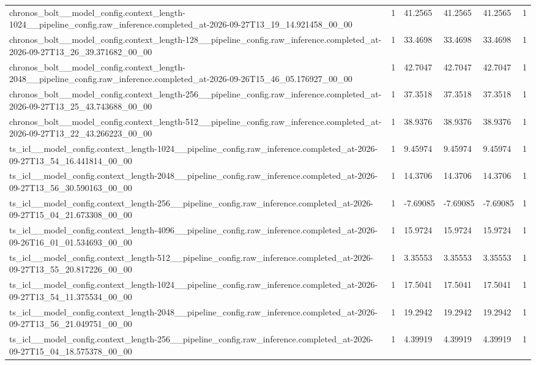 \begin{tabular}{llllll}
chronos\_bolt\_\_model\_config.context\_length-1024\_\_pipeline\_config.raw\_inference.completed\_at-2026-09-27T13\_19\_14.921458\_00\_00 & 1 & 41.2565 & 41.2565 & 41.2565 & 1 \\
chronos\_bolt\_\_model\_config.context\_length-128\_\_pipeline\_config.raw\_inference.completed\_at-2026-09-27T13\_26\_39.371682\_00\_00 & 1 & 33.4698 & 33.4698 & 33.4698 & 1 \\
chronos\_bolt\_\_model\_config.context\_length-2048\_\_pipeline\_config.raw\_inference.completed\_at-2026-09-26T15\_46\_05.176927\_00\_00 & 1 & 42.7047 & 42.7047 & 42.7047 & 1 \\
chronos\_bolt\_\_model\_config.context\_length-256\_\_pipeline\_config.raw\_inference.completed\_at-2026-09-27T13\_25\_43.743688\_00\_00 & 1 & 37.3518 & 37.3518 & 37.3518 & 1 \\
chronos\_bolt\_\_model\_config.context\_length-512\_\_pipeline\_config.raw\_inference.completed\_at-2026-09-27T13\_22\_43.266223\_00\_00 & 1 & 38.9376 & 38.9376 & 38.9376 & 1 \\
ts\_icl\_\_model\_config.context\_length-1024\_\_pipeline\_config.raw\_inference.completed\_at-2026-09-27T13\_54\_16.441814\_00\_00 & 1 & 9.45974 & 9.45974 & 9.45974 & 1 \\
ts\_icl\_\_model\_config.context\_length-2048\_\_pipeline\_config.raw\_inference.completed\_at-2026-09-27T13\_56\_30.590163\_00\_00 & 1 & 14.3706 & 14.3706 & 14.3706 & 1 \\
ts\_icl\_\_model\_config.context\_length-256\_\_pipeline\_config.raw\_inference.completed\_at-2026-09-27T15\_04\_21.673308\_00\_00 & 1 & -7.69085 & -7.69085 & -7.69085 & 1 \\
ts\_icl\_\_model\_config.context\_length-4096\_\_pipeline\_config.raw\_inference.completed\_at-2026-09-26T16\_01\_01.534693\_00\_00 & 1 & 15.9724 & 15.9724 & 15.9724 & 1 \\
ts\_icl\_\_model\_config.context\_length-512\_\_pipeline\_config.raw\_inference.completed\_at-2026-09-27T13\_55\_20.817226\_00\_00 & 1 & 3.35553 & 3.35553 & 3.35553 & 1 \\
ts\_icl\_\_model\_config.context\_length-1024\_\_pipeline\_config.raw\_inference.completed\_at-2026-09-27T13\_54\_11.375534\_00\_00 & 1 & 17.5041 & 17.5041 & 17.5041 & 1 \\
ts\_icl\_\_model\_config.context\_length-2048\_\_pipeline\_config.raw\_inference.completed\_at-2026-09-27T13\_56\_21.049751\_00\_00 & 1 & 19.2942 & 19.2942 & 19.2942 & 1 \\
ts\_icl\_\_model\_config.context\_length-256\_\_pipeline\_config.raw\_inference.completed\_at-2026-09-27T15\_04\_18.575378\_00\_00 & 1 & 4.39919 & 4.39919 & 4.39919 & 1 \\

\end{tabular}
